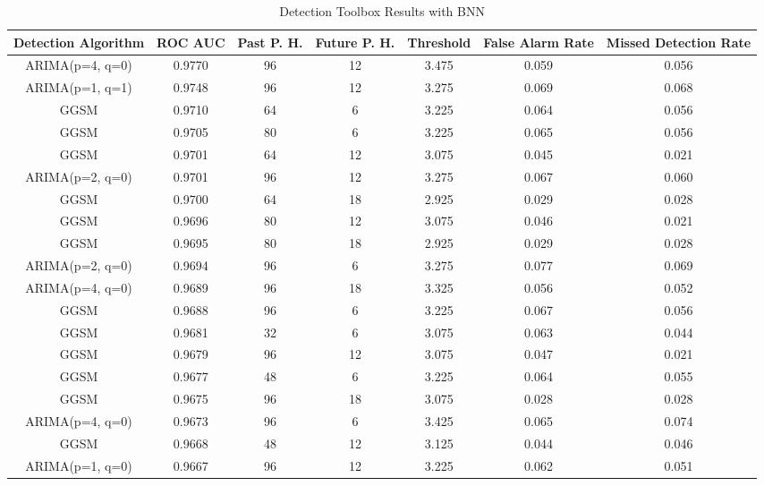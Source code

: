 \begin{table*}[th!]
\centering
\caption{Detection Toolbox Results with BNN}
    \label{table:bnnexperimenttwo}
    \begin{tabular}{|c|c|c|c|c|c|c|}
        \hline
        Detection Algorithm & ROC AUC & Past P. H. & Future P. H. & Threshold & False Alarm Rate & Missed Detection Rate \\
        \hline
        \hline
        ARIMA(p=4, q=0) & 0.9770 & 96 & 12 & 3.475 &  0.059 & 0.056 \\
        \hline
        ARIMA(p=1, q=1) & 0.9748 & 96 & 12 & 3.275 &  0.069 & 0.068 \\
        \hline
        GGSM & 0.9710 & 64 & 6 & 3.225 &  0.064 & 0.056 \\
        \hline
        GGSM & 0.9705 & 80 & 6 & 3.225 &  0.065 & 0.056 \\
        \hline
        GGSM & 0.9701 & 64 & 12 & 3.075 &  0.045 & 0.021 \\
        \hline
        ARIMA(p=2, q=0) & 0.9701 & 96 & 12 & 3.275 &  0.067 & 0.060 \\
        \hline
        GGSM & 0.9700 & 64 & 18 & 2.925 &  0.029 & 0.028 \\
        \hline
        GGSM & 0.9696 & 80 & 12 & 3.075 &  0.046 & 0.021 \\
        \hline
        GGSM & 0.9695 & 80 & 18 & 2.925 &  0.029 & 0.028 \\
        \hline
        ARIMA(p=2, q=0) & 0.9694 & 96 & 6 & 3.275 &  0.077 & 0.069 \\
        \hline
        ARIMA(p=4, q=0) & 0.9689 & 96 & 18 & 3.325 &  0.056 & 0.052 \\
        \hline
        GGSM & 0.9688 & 96 & 6 & 3.225 &  0.067 & 0.056 \\
        \hline
        GGSM & 0.9681 & 32 & 6 & 3.075 &  0.063 & 0.044 \\
        \hline
        GGSM & 0.9679 & 96 & 12 & 3.075 &  0.047 & 0.021 \\
        \hline
        GGSM & 0.9677 & 48 & 6 & 3.225 &  0.064 & 0.055 \\
        \hline
        GGSM & 0.9675 & 96 & 18 & 3.075 &  0.028 & 0.028 \\
        \hline
        ARIMA(p=4, q=0) & 0.9673 & 96 & 6 & 3.425 &  0.065 & 0.074 \\
        \hline
        GGSM & 0.9668 & 48 & 12 & 3.125 &  0.044 & 0.046 \\
        \hline
        ARIMA(p=1, q=0) & 0.9667 & 96 & 12 & 3.225 &  0.062 & 0.051 \\

\end{tabular}
\end{table*}
